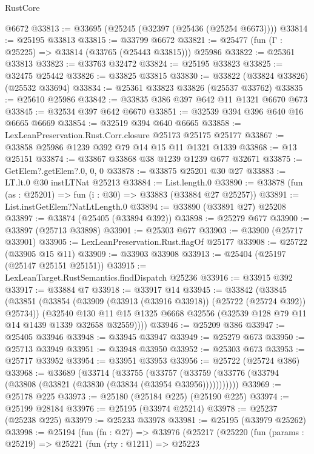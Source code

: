 \begin{lexlean}{RustCore}
\begin{coremodule}
    @6672
@33813 := @33695 (@25245 (@32397 (@25436 (@25254 @6673))))
@33814 := @25195 @33813
@33815 := @33799 @6672
@33821 := @25477 (fun (Γ : @25225) => @33814 (@33765 (@25443 @33815))) @25986
@33822 := @25361 @33813
@33823 := @33763 @32472
@33824 := @25195 @33823
@33825 := @32475 @25442
@33826 := @33825 @33815
@33830 := @33822 (@33824 @33826) (@25532 @33694)
@33834 := @25361 @33823 @33826 (@25537 @33762)
@33835 := @25610 @25986
@33842 := @33835 @386 @397 @642 @11 @1321 @6670 @673
@33845 := @32534 @397 @642 @6670
@33851 := @32539 @394 @396 @640 @16 @6665 @6669
@33854 := @32519 @394 @640 @6665
@33858 := LexLeanPreservation.Rust.Corr.closure @25173 @25175 @25177
@33867 := @33858 @25986 @1239 @392 @79 @14 @15 @11 @1321 @1339
@33868 := @13 @25151
@33874 := @33867 @33868 @38 @1239 @1239 @677 @32671
@33875 := GetElem?.getElem?.{0, 0, 0}
@33878 := @33875 @25201 @30 @27
@33883 := LT.lt.{0} @30 instLTNat @25213
@33884 := List.length.{0}
@33890 := @33878 (fun (as : @25201) => fun (i : @30) => @33883 (@33884 @27 @25257))
@33891 := List.instGetElem?NatLtLength.{0}
@33894 := @33890 (@33891 @27) @25208
@33897 := @33874 (@25405 (@33894 @392))
@33898 := @25279 @677
@33900 := @33897 (@25713 @33898)
@33901 := @25303 @677
@33903 := @33900 (@25717 @33901)
@33905 := LexLeanPreservation.Rust.flagOf @25177
@33908 := @25722 (@33905 @15 @11)
@33909 := @33903 @33908
@33913 := @25404 (@25197 (@25147 @25151 @25151))
@33915 := LexLeanTarget.RustSemantics.findDispatch @25236
@33916 := @33915 @392
@33917 := @33884 @7
@33918 := @33917 @14
@33945 := @33842
    (@33845
      (@33851
        (@33854 (@33909 (@33913 (@33916 @33918)) (@25722 (@25724 @392)) @25734))
        (@32540
          @130
          @11
          @15
          @1325
          @6668
          @32556
          (@32539 @128 @79 @11 @14 @1439 @1339 @32658 @32559))))
@33946 := @25209 @386
@33947 := @25405 @33946
@33948 := @33945 @33947
@33949 := @25279 @673
@33950 := @25713 @33949
@33951 := @33948 @33950
@33952 := @25303 @673
@33953 := @25717 @33952
@33954 := @33951 @33953
@33956 := @25722 (@25724 @386)
@33968 := @33689
    (@33714
      (@33755
        (@33757 (@33759 (@33776 (@33794 (@33808 (@33821 (@33830 (@33834 (@33954 @33956)))))))))))
@33969 := @25178 @225
@33973 := @25180 (@25184 @225) (@25190 @225)
@33974 := @25199 @28184
@33976 := @25195 (@33974 @25214)
@33978 := @25237 (@25238 @225)
@33979 := @25233 @33978
@33981 := @25195 (@33979 @25262)
@33998 := @25194
    (fun (fn : @27) =>
    @33976
      (@25217
        (@25220
          (fun (params : @25219) =>
          @25221
            (fun (rty : @1211) =>
            @25223

\end{coremodule}
\end{lexlean}
